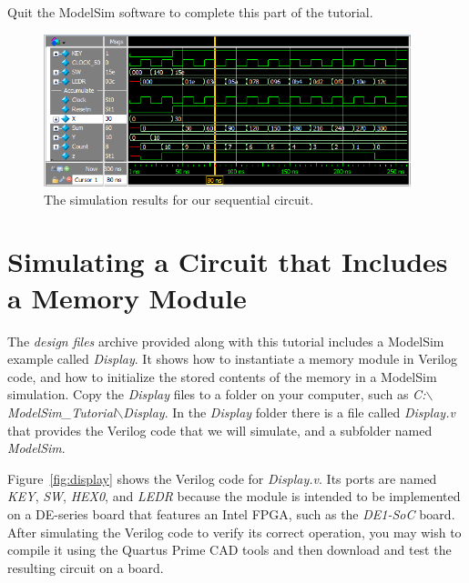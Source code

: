 \documentclass[11pt, twoside, pdftex]{article}
\begin{document}
\noindent
Quit the ModelSim software to complete this part of the tutorial.

\begin{figure}[h]
	\begin{center}
		\includegraphics[width = 0.95\textwidth]{figures/gui3.png}
	\end{center}
		  \caption{The simulation results for our sequential circuit.}
	\label{fig:gui3}
\end{figure}

\section{Simulating a Circuit that Includes a Memory Module}

The {\it design files} archive provided along with this tutorial includes a ModelSim example 
called {\it Display}. It shows how to instantiate a memory module in Verilog code, and how
to initialize the stored contents of the memory in a ModelSim simulation. Copy the {\it Display}
files to a folder on your computer, such as 
{\it C:$\backslash$ModelSim\_Tutorial$\backslash$Display}. 
In the {\it Display} folder there is a file called {\it Display.v}
that provides the Verilog code that we will simulate, and 
a subfolder named {\it ModelSim}.

\noindent
Figure~\ref{fig:display} shows the Verilog code for {\it Display.v}.
Its ports are named {\it KEY}, {\it SW}, {\it HEX0}, and {\it LEDR} because the module is intended 
to be implemented on a DE-series board that features an Intel FPGA, such as the {\it DE1-SoC}
board. After simulating the Verilog code to verify its correct operation, you may
wish to compile it using the Quartus Prime CAD tools and then download and test the 
resulting circuit on a board.  
\end{document}
